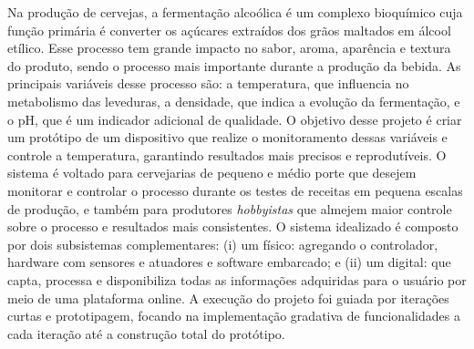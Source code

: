 Na produção de cervejas, a fermentação alcoólica é um complexo bioquímico cuja função primária é converter os açúcares extraídos dos grãos maltados em álcool etílico. Esse processo tem grande impacto no sabor, aroma, aparência e textura do produto, sendo o processo mais importante durante a produção da bebida. 
As principais variáveis desse processo são: a temperatura, que influencia no metabolismo das leveduras, a densidade, que indica a evolução da fermentação, e o pH, que é um indicador adicional de qualidade. 
O objetivo desse projeto é criar um protótipo de um dispositivo que realize o monitoramento dessas variáveis e controle a temperatura, garantindo resultados mais precisos e reprodutíveis. O sistema é voltado para cervejarias de pequeno e médio porte que desejem monitorar e controlar o processo durante os testes de receitas em pequena escalas de produção, e também para produtores \textit{hobbyistas} que almejem maior controle sobre o processo e resultados mais consistentes. 
O sistema idealizado é composto por dois subsistemas complementares: (i) um físico: agregando o controlador, hardware com sensores e atuadores e software embarcado; e (ii) um digital: que capta, processa e disponibiliza todas as informações adquiridas para o usuário por meio de uma plataforma online. A execução do projeto foi guiada por iterações curtas e prototipagem, focando na implementação gradativa de funcionalidades a cada iteração até a construção total do protótipo.

